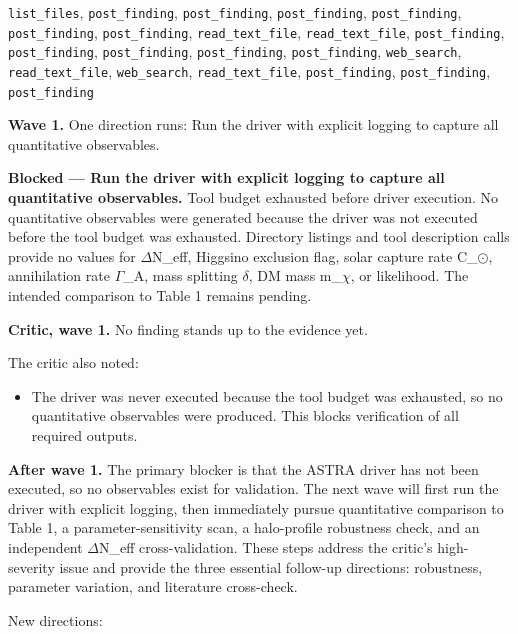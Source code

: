 \documentclass[11pt,a4paper]{article}
\begin{document}
\texttt{list\_files}, \texttt{post\_finding}, \texttt{post\_finding}, \texttt{post\_finding}, \texttt{post\_finding}, \texttt{post\_finding}, \texttt{post\_finding}, \texttt{read\_text\_file}, \texttt{read\_text\_file}, \texttt{post\_finding}, \texttt{post\_finding}, \texttt{post\_finding}, \texttt{post\_finding}, \texttt{post\_finding}, \texttt{web\_search}, \texttt{read\_text\_file}, \texttt{web\_search}, \texttt{read\_text\_file}, \texttt{post\_finding}, \texttt{post\_finding}, \texttt{post\_finding}\par
\textbf{Wave 1.} One direction runs: Run the driver with explicit logging to capture all quantitative observables.

\textbf{Blocked --- Run the driver with explicit logging to capture all quantitative observables.} Tool budget exhausted before driver execution. No quantitative observables were generated because the driver was not executed before the tool budget was exhausted. Directory listings and tool description calls provide no values for $\Delta$N\_eff, Higgsino exclusion flag, solar capture rate C\_$\odot$, annihilation rate $\Gamma$\_A, mass splitting $\delta$, DM mass m\_$\chi$, or likelihood. The intended comparison to Table 1 remains pending.

\textbf{Critic, wave 1.} No finding stands up to the evidence yet.

The critic also noted:

\begin{itemize}
  \item The driver was never executed because the tool budget was exhausted, so no quantitative observables were produced. This blocks verification of all required outputs.
\end{itemize}
\textbf{After wave 1.} The primary blocker is that the ASTRA driver has not been executed, so no observables exist for validation. The next wave will first run the driver with explicit logging, then immediately pursue quantitative comparison to Table 1, a parameter-sensitivity scan, a halo-profile robustness check, and an independent $\Delta$N\_eff cross-validation. These steps address the critic's high-severity issue and provide the three essential follow-up directions: robustness, parameter variation, and literature cross-check.

New directions:
\end{document}
